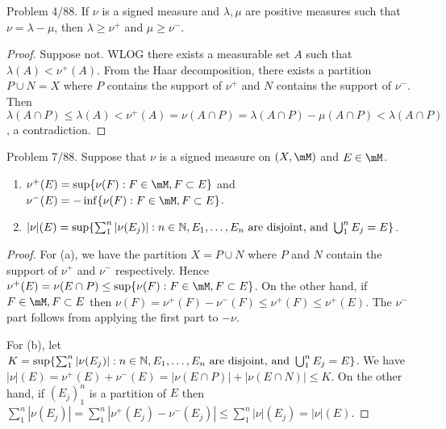 \documentclass{article}
\begin{document}
 Problem 4/88. If $\nu$ is a signed measure and $\lambda, \mu$ are positive measures such that $\nu = \lambda - \mu$, then $\lambda \ge \nu^+$ and $\mu \ge \nu^-$.
\begin{proof}
Suppose not.  WLOG there exists a measurable set $A$ such that $\lambda(A) < \nu^+(A)$.  From the Haar decomposition, there exists a partition $P \cup N = X$ where $P$ contains the support of $\nu^+$ and $N$ contains the support of $\nu^-$.  Then $\lambda(A \cap P) \le \lambda(A) < \nu^+(A) = \nu(A \cap P) = \lambda(A \cap P) - \mu(A \cap P) < \lambda(A \cap P)$, a contradiction.
\end{proof}

 Problem 7/88. Suppose that $\nu$ is a signed measure on $(X, \mM)$ and $E \in \mM$.
\begin{enumerate}[\bfseries a.]

\item $\nu^+(E) = \sup\{\nu(F) : F \in \mM, F \subset E\}$ and $\nu^-(E) = - \inf\{\nu(F) : F \in \mM, F \subset E\}$.

\item $|\nu|(E) = \sup\{\sum_1^n |\nu(E_j)| : n \in \mathbb{N}, E_1, \ldots, E_n \text{ are disjoint, and } \bigcup_1^n E_j = E\}$.
\end{enumerate}

\begin{proof} 
For (a), we have the partition $X = P \cup N$ where $P$ and $N$ contain the support of $\nu^+$ and $\nu^-$ respectively.  Hence $\nu^+(E) = \nu(E \cap P) \le \sup\{\nu(F) : F \in \mM, F \subset E\}$.  On the other hand, if $F \in \mM, F \subset E$ then $\nu(F) = \nu^+(F) - \nu^-(F) \le \nu^+(F) \le \nu^+(E)$. The $\nu^-$ part follows from applying the first part to $-\nu$.

For (b), let $K = \sup\{\sum_1^n |\nu(E_j)| : n \in \mathbb{N}, E_1, \ldots, E_n \text{ are disjoint, and } \bigcup_1^n E_j = E\}$. We have $|\nu|(E) = \nu^+(E) + \nu^-(E) = |\nu(E \cap P)| + |\nu(E \cap N)| \le K$.  On the other hand, if $(E_j)_1^n$ is a partition of $E$ then 
$\sum_1^n |\nu(E_j)| = \sum_1^n |\nu^+(E_j) - \nu^-(E_j)| \le  \sum_1^n |\nu|(E_j) = |\nu|(E)$. 
\end{proof}
\end{document}

